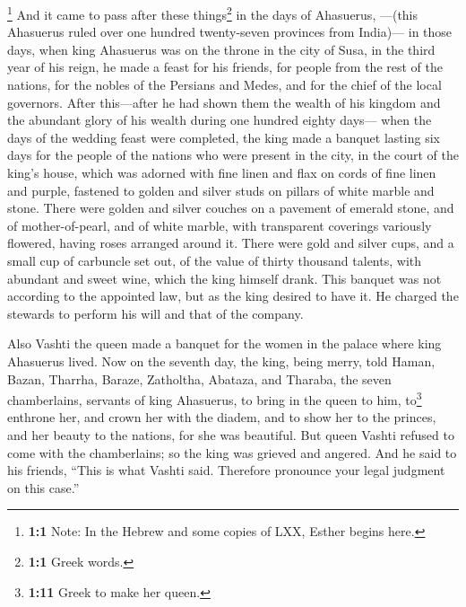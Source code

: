\footnote{\textbf{1:1} Note: In the Hebrew and some copies of LXX,
  Esther begins here.} And it came to pass after these things\footnote{\textbf{1:1}
  Greek words.} in the days of Ahasuerus, ---(this Ahasuerus ruled over
one hundred twenty-seven provinces from India)---  in
those days, when king Ahasuerus was on the throne in the city of Susa,
 in the third year of his reign, he made a feast for his
friends, for people from the rest of the nations, for the nobles of the
Persians and Medes, and for the chief of the local governors.
 After this---after he had shown them the wealth of his
kingdom and the abundant glory of his wealth during one hundred eighty
days---  when the days of the wedding feast were
completed, the king made a banquet lasting six days for the people of
the nations who were present in the city, in the court of the king's
house,  which was adorned with fine linen and flax on
cords of fine linen and purple, fastened to golden and silver studs on
pillars of white marble and stone. There were golden and silver couches
on a pavement of emerald stone, and of mother-of-pearl, and of white
marble, with transparent coverings variously flowered, having roses
arranged around it.  There were gold and silver cups, and
a small cup of carbuncle set out, of the value of thirty thousand
talents, with abundant and sweet wine, which the king himself drank.
 This banquet was not according to the appointed law, but
as the king desired to have it. He charged the stewards to perform his
will and that of the company.

 Also Vashti the queen made a banquet for the women in the
palace where king Ahasuerus lived.  Now on the seventh
day, the king, being merry, told Haman, Bazan, Tharrha, Baraze,
Zatholtha, Abataza, and Tharaba, the seven chamberlains, servants of
king Ahasuerus,  to bring in the queen to him,
to\footnote{\textbf{1:11} Greek to make her queen.} enthrone her, and
crown her with the diadem, and to show her to the princes, and her
beauty to the nations, for she was beautiful.  But queen
Vashti refused to come with the chamberlains; so the king was grieved
and angered.  And he said to his friends, ``This is what
Vashti said. Therefore pronounce your legal judgment on this case.''

